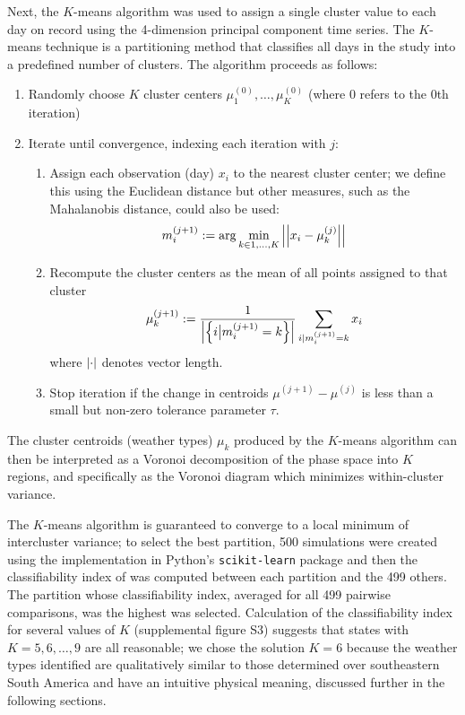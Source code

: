 \documentclass[twocol]{ametsoc}
\begin{document}
Next, the $K$-means algorithm was used to assign a single cluster value to each day on record using the 4-dimension principal component time series.
The $K$-means technique is a partitioning method that classifies all days in the study into a predefined number of clusters.
The algorithm proceeds as follows:
\begin{enumerate}
	\item Randomly choose $K$ cluster centers $\mu_1^{(0)}, \ldots, \mu_K^{(0)}$ (where $0$ refers to the $0$th iteration)
	\item Iterate until convergence, indexing each iteration with $j$:
	\begin{enumerate}
		\item Assign each observation (day) $x_i$ to the nearest cluster center; we define this using the Euclidean distance but other measures, such as the Mahalanobis distance, could also be used:
		\begin{equation}
			m_i^{(j+1)} := \arg\min_{k\in 1,\ldots,K} \abs{\abs{x_i - \mu_k^{(j)}}}
		\end{equation}
		\item Recompute the cluster centers as the mean of all points assigned to that cluster
		\begin{equation}
			\mu_k^{(j+1)} := \frac{1}{\abs{\qty{i \big| m_i^{(j+1)}=k}}} \sum_{i | m_i^{(j+1)}=k} x_i
		\end{equation}
		where $\abs{\cdot}$ denotes vector length.
		\item Stop iteration if the change in centroids $\mu^{(j+1)} - \mu^{(j)}$ is less than a small but non-zero tolerance parameter $\tau$.
	\end{enumerate}
\end{enumerate}
The cluster centroids (weather types) $\mu_k$ produced by the $K$-means algorithm can then be interpreted as a Voronoi decomposition of the phase space into $K$ regions, and specifically as the Voronoi diagram which minimizes within-cluster variance.

The $K$-means algorithm is guaranteed to converge to a local minimum of intercluster variance; to select the best partition, 500 simulations were created using the implementation in Python's \texttt{scikit-learn} package \citep{Pedregosa:2012tv} and then the classifiability index of \citet{Michelangeli1995} was computed between each partition and the 499 others.
The partition whose classifiability index, averaged for all 499 pairwise comparisons, was the highest was selected.
Calculation of the classifiability index for several values of $K$ (supplemental figure S3) suggests that states with $K=5,6,\ldots,9$ are all reasonable; we chose the solution $K=6$ because the weather types identified are qualitatively similar to those determined over southeastern South America \citep{Munoz2015,Munoz2016} and have an intuitive physical meaning, discussed further in the following sections.
\end{document}
